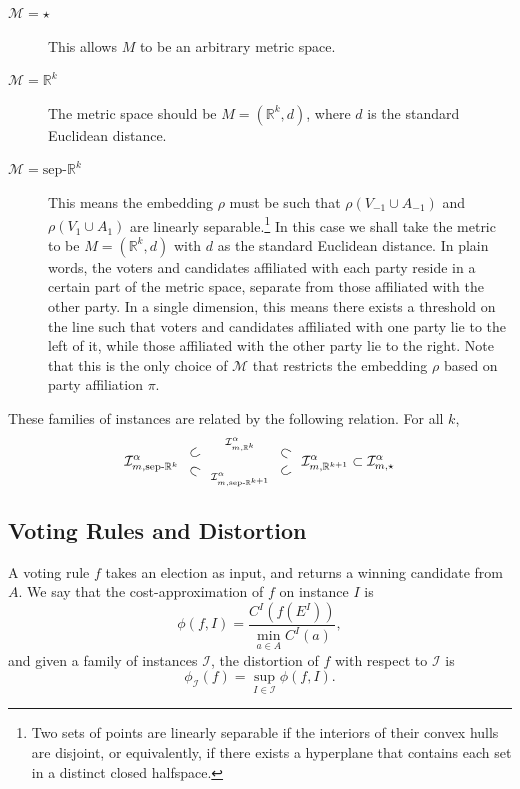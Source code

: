 \documentclass[letterpaper]{article} %
\theoremstyle{definition}
\newcommand{\upsubset}{\mathbin{\rotatebox[origin=c]{30}{$\subset$}}}
\newcommand{\downsubset}{\mathbin{\rotatebox[origin=c]{-30}{$\subset$}}}
\newcommand{\bbR}{\mathbb{R}}
\newcommand{\calI}{\mathcal{I}}
\newcommand{\calM}{\mathcal{M}}
\newcommand{\pleft}{-1}
\newcommand{\pright}{1}
\newcommand{\all}{\star}
\newcommand{\sep}{\textrm{sep-}}
\newcommand{\euc}[1]{\bbR^{#1}}
\newcommand{\eucsep}[1]{\sep\euc{#1}}
\newcommand{\I}{\calI}
\begin{document}
\begin{description}
	\item[$\calM=\star$] This allows $M$ to be an arbitrary metric space.
	\item[$\calM = \bbR^k$] The metric space should be $M = (\bbR^k,d)$, where $d$ is the standard Euclidean distance.
	\item [$\calM = \textrm{sep-}\bbR^k$] This means the embedding $\rho$ must be such that $\rho(V_{\pleft} \cup A_{\pleft})$ and $\rho(V_{\pright} \cup A_{\pright})$ are linearly separable.\footnote{Two sets of points are linearly separable if the interiors of their convex hulls are disjoint, or equivalently, if there exists a hyperplane that contains each set in a distinct closed halfspace.} In this case we shall take the metric to be $M = (\bbR^k,d)$ with $d$ as the standard Euclidean distance. In plain words, the voters and candidates affiliated with each party reside in a certain part of the metric space, separate from those affiliated with the other party. In a single dimension, this means there exists a threshold on the line such that voters and candidates affiliated with one party lie to the left of it, while those affiliated with the other party lie to the right. %
	Note that this is the only choice of $\calM$ that restricts the embedding $\rho$ based on party affiliation $\pi$.
\end{description}

These families of instances are related by the following relation. For all $k$,
$$
\I^{\alpha}_{m,\eucsep{k}} \ \
\substack{\upsubset \\[0.1cm] \downsubset} \ \
\substack{\I^{\alpha}_{m,\euc{k}} \\[0.5cm] \I^{\alpha}_{m,\eucsep{k+1}}} \ \
\substack{\downsubset \\[0.1cm] \upsubset} \ \
\I^{\alpha}_{m,\euc{k+1}} \subset \I^{\alpha}_{m,\all}
$$

\subsection{Voting Rules and Distortion}

A voting rule $f$ takes an election as input, and returns a winning candidate from $A$. We say that the cost-approximation of $f$ on instance $I$ is
$$
\phi(f,I) = \frac{C^I(f(E^I))}{\min_{a \in A} C^I(a)},
$$
and given a family of instances $\calI$, the distortion of $f$ with respect to $\calI$ is
$$
\phi_{\calI}(f) = \sup_{I \in \calI} \phi(f,I).
$$
\end{document}
